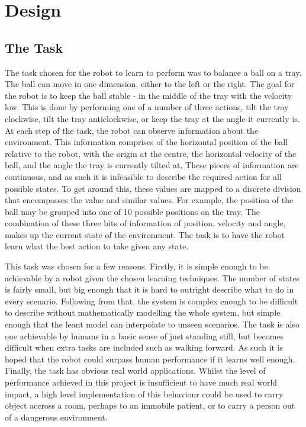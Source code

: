 \documentclass[12pt,a4paper]{article}
\begin{document}
\section{Design}

\subsection{The Task}
The task chosen for the robot to learn to perform was to balance a ball on a tray. The ball can move in one dimension, either to the left or the right. The goal for the robot is to keep the ball stable - in the middle of the tray with the velocity low. This is done by performing one of a number of three actions, tilt the tray clockwise, tilt the tray anticlockwise, or keep the tray at the angle it currently is. At each step of the task, the robot can observe information about the environment. This information comprises of the horizontal position of the ball relative to the robot, with the origin at the centre, the horizontal velocity of the ball, and the angle the tray is currently tilted at. These pieces of information are continuous, and as such it is infeasible to describe the required action for all possible states. To get around this, these values are mapped to a discrete division that encompasses the value and similar values. For example, the position of the ball may be grouped into one of 10 possible positions on the tray. The combination of these three bits of information of position, velocity and angle, makes up the current state of the environment. The task is to have the robot learn what the best action to take given any state.

This task was chosen for a few reasons. Firstly, it is simple enough to be achievable by a robot given the chosen learning techniques. The number of states is fairly small, but big enough that it is hard to outright describe what to do in every scenario. Following from that, the system is complex enough to be difficult to describe without mathematically modelling the whole system, but simple enough that the leant model can interpolate to unseen scenarios. The task is also one achievable by humans in a basic sense of just standing still, but becomes difficult when extra tasks are included such as walking forward. As such it is hoped that the robot could surpass human performance if it learns well enough. Finally, the task has obvious real world applications. Whilst the level of performance achieved in this project is insufficient to have much real world impact, a high level implementation of this behaviour could be used to carry object accross a room, perhaps to an immobile patient, or to carry a person out of a dangerous environment.
\end{document}

